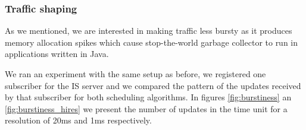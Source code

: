 \subsubsection*{Traffic shaping}

As we mentioned, we are interested in making traffic less bursty as it produces memory allocation spikes which cause stop-the-world garbage collector to run in applications written in Java. 

We ran an experiment with the same setup as before, we registered one subscriber for the IS server and we compared the pattern of the updates received by that subscriber for both scheduling algorithms. In figures \ref{fig:burstiness} an \ref{fig:burstiness_hires} we present the number of updates in the time unit for a resolution of 20ms and 1ms respectively. 

